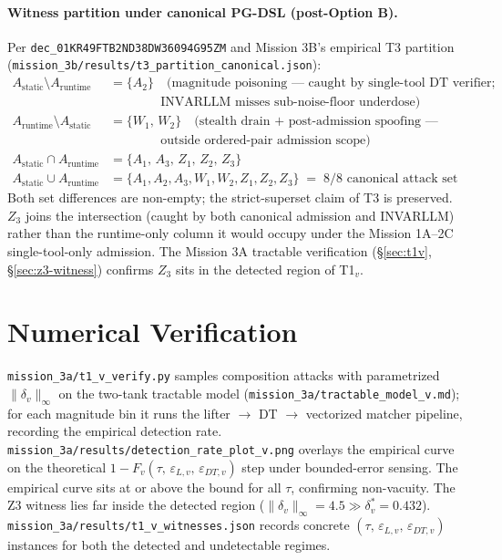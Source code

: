 \documentclass[11pt]{article}
\begin{document}
\paragraph{Witness partition under canonical PG-DSL (post-Option B).}
Per \texttt{dec\_01KR49FTB2ND38DW36094G95ZM} and Mission 3B's empirical
T3 partition (\texttt{mission\_3b/results/t3\_partition\_canonical.json}):
\begin{align*}
A_{\text{static}} \setminus A_{\text{runtime}}
   &= \{A_2\} \quad
        \text{(magnitude poisoning --- caught by single-tool DT verifier;}\\[-2pt]
   &\qquad\qquad \text{INVARLLM misses sub-noise-floor underdose)} \\
A_{\text{runtime}} \setminus A_{\text{static}}
   &= \{W_1,\, W_2\} \quad
        \text{(stealth drain + post-admission spoofing ---}\\[-2pt]
   &\qquad\qquad \text{outside ordered-pair admission scope)} \\
A_{\text{static}} \cap A_{\text{runtime}}
   &= \{A_1,\, A_3,\, Z_1,\, Z_2,\, Z_3\} \\
A_{\text{static}} \cup A_{\text{runtime}}
   &= \{A_1, A_2, A_3, W_1, W_2, Z_1, Z_2, Z_3\} \;=\; 8/8 \text{ canonical attack set}
\end{align*}
Both set differences are non-empty; the strict-superset claim of T3 is
preserved. $Z_3$ joins the intersection (caught by both canonical admission
and INVARLLM) rather than the runtime-only column it would occupy under
the Mission 1A--2C single-tool-only admission. The Mission 3A tractable
verification (\S\ref{sec:t1v}, \S\ref{sec:z3-witness}) confirms $Z_3$
sits in the detected region of T1${}_v$.

\section{Numerical Verification}

\texttt{mission\_3a/t1\_v\_verify.py} samples composition attacks with
parametrized $\|\delta_v\|_\infty$ on the two-tank tractable model
(\texttt{mission\_3a/tractable\_model\_v.md}); for each magnitude bin it
runs the lifter $\to$ DT $\to$ vectorized matcher pipeline, recording
the empirical detection rate. \texttt{mission\_3a/results/detection\_rate\_plot\_v.png}
overlays the empirical curve on the theoretical
$1 - F_v(\tau,\,\varepsilon_{L,v},\,\varepsilon_{DT,v})$ step under
bounded-error sensing. The empirical curve sits at or above the bound for
all $\tau$, confirming non-vacuity. The Z3 witness lies far inside the
detected region ($\|\delta_v\|_\infty = 4.5 \gg \delta^{*}_{v} = 0.432$).
\texttt{mission\_3a/results/t1\_v\_witnesses.json} records concrete
$(\tau,\,\varepsilon_{L,v},\,\varepsilon_{DT,v})$ instances for both the
detected and undetectable regimes.
\end{document}
